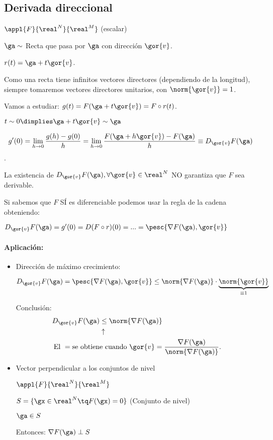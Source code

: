 \subsection{Derivada direccional}

$\appl{F}{\real^N}{\real^M}$ (escalar)

$\ga \sim$ Recta que pasa por $\ga$ con dirección $\gor{v}$.

$r(t) = \ga + t\gor{v}$. 

\obs
Como una recta tiene infinitos vectores directores (dependiendo de la longitud), siempre tomaremos vectores directores unitarios, con $\norm{\gor{v}} = 1$.


Vamos a estudiar: $g(t) = F(\ga + t\gor{v}) = F \circ r (t)$.

$t \sim 0 \dimplies \ga + t\gor{v} \sim \ga$
\begin{defn} 
$$g'(0) = \displaystyle\lim_{h \rightarrow 0} \frac{g(h)-g(0)}{h} = \displaystyle\lim_{h \rightarrow 0} \frac{F(\ga+h\gor{v})-F(\ga)}{h} \equiv D_{\gor{v}}F(\ga)$$. 
\end{defn}

\obs
La existencia de $D_{\gor{v}}F(\ga), \forall \gor{v}\in \real^N$ NO garantiza que $F$ sea derivable.


Si sabemos que $F$ SÍ es diferenciable podemos usar la regla de la cadena obteniendo:

$D_{\gor{v}}F(\ga) = g'(0) = D(F\circ r)(0) = ... = \pesc{\nabla F(\ga),\gor{v}}$


\paragraph{Aplicación:} 
\begin{itemize}
 \item 
 Dirección de máximo crecimiento:

$D_{\gor{v}}F(\ga) = \pesc{\nabla F(\ga),\gor{v}}\leq \norm{\nabla F(\ga)}\cdot \underbrace{\norm{\gor{v}}}_{\equiv 1}$

Conclusión:
\begin{align*}
D_{\gor{v}}F(\ga) &\leq \norm{\nabla F(\ga)}\\
&\uparrow\\
\text{El }= \text{se obtien}&\text{e cuando }\gor{v} = \displaystyle \frac{\nabla F(\ga)}{\norm{\nabla F(\ga)}}. 
\end{align*}

 
 \item
 Vector perpendicular a los conjuntos de nivel
 
 $\appl{F}{\real^N}{\real^M}$
 
 $S = \{ \gx \in \real^N \tq F(\gx) = 0\}$ (Conjunto de nivel)
 
 $\ga \in S$
 
 Entonces: $\nabla F(\ga) \perp S$
\end{itemize}

